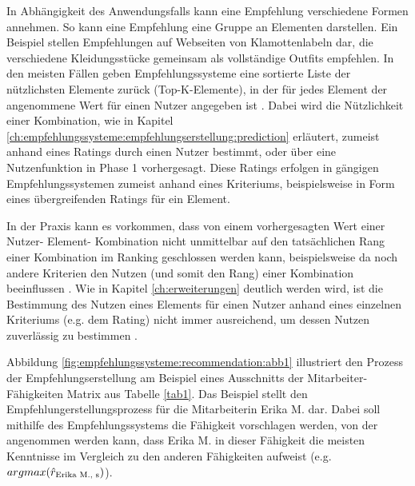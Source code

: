 In Abhängigkeit des Anwendungsfalls kann eine Empfehlung verschiedene Formen annehmen.
So kann eine Empfehlung eine Gruppe an Elementen darstellen.
Ein Beispiel stellen Empfehlungen auf Webseiten von Klamottenlabeln dar, die verschiedene Kleidungsstücke gemeinsam als vollständige Outfits empfehlen.
In den meisten Fällen geben Empfehlungssysteme eine sortierte Liste der nützlichsten Elemente zurück (Top-K-Elemente), in der für jedes Element der angenommene Wert für einen Nutzer angegeben ist \cite[S. 6]{ricci:inbook}\cite[S. 3]{recommenderSystems:2016}.
Dabei wird die Nützlichkeit einer Kombination, wie in Kapitel \ref{ch:empfehlungssysteme:empfehlungserstellung:prediction} erläutert, zumeist anhand eines Ratings durch einen Nutzer bestimmt, oder über eine Nutzenfunktion in Phase 1 vorhergesagt.
Diese Ratings erfolgen in gängigen Empfehlungssystemen zumeist anhand eines Kriteriums, beispielsweise in Form eines übergreifenden Ratings für ein Element.

In der Praxis kann es vorkommen, dass von einem vorhergesagten Wert einer Nutzer- Element- Kombination nicht unmittelbar auf den tatsächlichen Rang einer Kombination im Ranking geschlossen werden kann, beispielsweise da noch andere Kriterien den Nutzen (und somit den Rang) einer Kombination beeinflussen \cite[S. 405]{unternährer:article}.
Wie in Kapitel \ref{ch:erweiterungen} deutlich werden wird, ist die Bestimmung des Nutzen eines Elements für einen Nutzer anhand eines einzelnen Kriteriums (e.g. dem Rating) nicht immer ausreichend, um dessen Nutzen zuverlässig zu bestimmen \cite[S. 847]{adomavicius:4:inbook}.

Abbildung \ref{fig:empfehlungssysteme:recommendation:abb1} illustriert den Prozess der Empfehlungserstellung am Beispiel eines Ausschnitts der Mitarbeiter-Fähigkeiten Matrix aus Tabelle \ref{tab1}.
Das Beispiel stellt den Empfehlungerstellungsprozess für die Mitarbeiterin Erika M. dar.
Dabei soll mithilfe des Empfehlungssystems die Fähigkeit vorschlagen werden, von der angenommen werden kann, dass Erika M. in dieser Fähigkeit die meisten Kenntnisse im Vergleich zu den anderen Fähigkeiten aufweist (e.g. $argmax(\hat{r}_{\textnormal{Erika M., s}})$).

